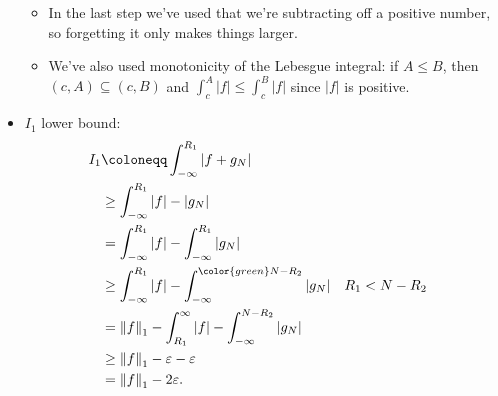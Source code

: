 \begin{solution}
\begin{itemize}
  \begin{itemize}
  \item
    In the last step we've used that we're subtracting off a positive
    number, so forgetting it only makes things larger.
  \item
    We've also used monotonicity of the Lebesgue integral: if
    \(A\leq B\), then \((c, A) \subseteq (c, B)\) and
    \(\int_{c}^A {\left\lvert {f} \right\rvert} \leq \int_c^B {\left\lvert {f} \right\rvert}\)
    since \({\left\lvert {f} \right\rvert}\) is positive.
  \end{itemize}
\item
  \(I_1\) lower bound:
  \begin{align*}
  I_1 
  &\coloneqq\int_{-\infty}^{R_1} {\left\lvert {f + g_N} \right\rvert} \\
  &\geq \int_{-\infty}^{R_1} {\left\lvert {f} \right\rvert} - {\left\lvert {g_N} \right\rvert} \\
  &= \int_{-\infty}^{R_1} {\left\lvert {f} \right\rvert} - \int_{-\infty}^{R_1} {\left\lvert {g_N} \right\rvert} \\
  &\geq \int_{-\infty}^{R_1} {\left\lvert {f} \right\rvert} - \int_{-\infty}^{\color{green} N-R_2} {\left\lvert {g_N} \right\rvert} && R_1 < N-R_2 \\
  &= {\left\lVert {f} \right\rVert}_1 - \int_{R_1}^{ \infty } {\left\lvert {f} \right\rvert} - \int_{- \infty }^{N-R_2} {\left\lvert {g_N} \right\rvert} \\
  &\geq {\left\lVert {f} \right\rVert}_1 - {\varepsilon}- {\varepsilon}\\
  &= {\left\lVert {f} \right\rVert}_1 - 2{\varepsilon}
  .\end{align*}


\end{itemize}
\end{solution}
